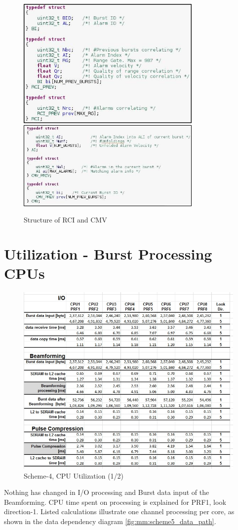 \begin{figure}[h!]
	\centering
	\includegraphics[width=90mm]{figures/biv_struct1}
	\includegraphics[width=90mm]{figures/biv_struct2}
	\caption{Structure of RCI and CMV}
	\label{fig:mm:biv_struct}
\end{figure}

\section{Utilization - Burst Processing CPUs}
\label{app:sch4_cpu_util}
\begin{figure}[h!]
	\centering
	\includegraphics[width=160mm]{figures/scheme5_cpu_util1}
	\caption{Scheme-4, CPU Utilization (1/2)}
	\label{fig:mm:scheme5_cpu_util1}
\end{figure}
Nothing has changed in I/O processing and Burst data input of the Beamforming. CPU time spent on processing is explained for PRF1, look direction-1. Listed calculations illustrate one channel processing per core, as shown in the data dependency diagram \ref{fig:mm:scheme5_data_path}.

